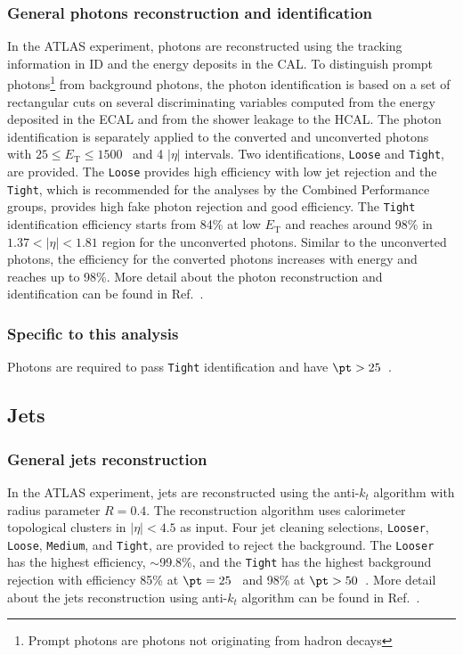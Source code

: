\subsubsection{General photons reconstruction and identification}
\label{subsubsec:event_photons_general}
In the ATLAS experiment, photons are reconstructed using the tracking information in ID and the energy deposits in the CAL.
To distinguish prompt photons\footnote{Prompt photons are photons not originating from hadron decays} from background photons, the photon identification is based on a set of rectangular cuts on several discriminating variables computed from the energy deposited in the ECAL and from the shower leakage to the HCAL.
The photon identification is separately applied to the converted and unconverted photons with $25 \le E_{\mathrm{T}} \le 1500$~{\GeV} and 4 $|\eta|$ intervals.
Two identifications, \texttt{Loose} and \texttt{Tight}, are provided.
The \texttt{Loose} provides high efficiency with low jet rejection and the \texttt{Tight}, which is recommended for the analyses by the Combined Performance groups, provides high fake photon rejection and good efficiency.
The \texttt{Tight} identification efficiency starts from 84\% at low $E_{\mathrm{T}}$ and reaches around 98\% in $1.37 < |\eta| < 1.81$ region for the unconverted photons.
Similar to the unconverted photons, the efficiency for the converted photons increases with energy and reaches up to 98\%.
More detail about the photon reconstruction and identification can be found in Ref.~\cite{ATLAS:2011kuc}.


\subsubsection{Specific to this analysis}
\label{subsubsec:event_photons_specific}
Photons are required to pass \texttt{Tight} identification and have $\pt > 25$~{\GeV}.


\subsection{Jets}
\label{subsec:event_jets}


\subsubsection{General jets reconstruction}
\label{subsubsec:event_jets_general}
In the ATLAS experiment, jets are reconstructed using the anti-$k_{t}$ algorithm with radius parameter $R = 0.4$.
The reconstruction algorithm uses calorimeter topological clusters in $|\eta| < 4.5$ as input.
Four jet cleaning selections, \texttt{Looser}, \texttt{Loose}, \texttt{Medium}, and \texttt{Tight}, are provided to reject the background.
The \texttt{Looser} has the highest efficiency, $\sim$99.8\%, and the \texttt{Tight} has the highest background rejection with efficiency 85\% at $\pt = 25$~{\GeV} and 98\% at $\pt > 50$~{\GeV}.
More detail about the jets reconstruction using anti-$k_{t}$ algorithm can be found in Ref.~\cite{Cacciari:2008gp}.

